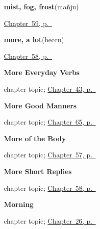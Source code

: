 \noindent\begin{minipage}[t]{\linewidth}
\raggedright
\textbf{mist, fog, frost}\enspace\emph{}\enspace(mañju)\par
\footnotesize \hyperref[ch:ka-weather-ground]{Chapter~59, p.~\pageref*{ch:ka-weather-ground}}
\end{minipage}\par\smallskip

\noindent\begin{minipage}[t]{\linewidth}
\raggedright
\textbf{more, a lot}\enspace\emph{}\enspace(heccu)\par
\footnotesize \hyperref[ch:ka-more-replies]{Chapter~58, p.~\pageref*{ch:ka-more-replies}}
\end{minipage}\par\smallskip

\noindent\begin{minipage}[t]{\linewidth}
\raggedright
\textbf{More Everyday Verbs}\par
\footnotesize chapter topic; \hyperref[ch:ka-more-verbs]{Chapter~43, p.~\pageref*{ch:ka-more-verbs}}
\end{minipage}\par\smallskip

\noindent\begin{minipage}[t]{\linewidth}
\raggedright
\textbf{More Good Manners}\par
\footnotesize chapter topic; \hyperref[ch:ka-manners]{Chapter~65, p.~\pageref*{ch:ka-manners}}
\end{minipage}\par\smallskip

\noindent\begin{minipage}[t]{\linewidth}
\raggedright
\textbf{More of the Body}\par
\footnotesize chapter topic; \hyperref[ch:ka-more-body]{Chapter~57, p.~\pageref*{ch:ka-more-body}}
\end{minipage}\par\smallskip

\noindent\begin{minipage}[t]{\linewidth}
\raggedright
\textbf{More Short Replies}\par
\footnotesize chapter topic; \hyperref[ch:ka-more-replies]{Chapter~58, p.~\pageref*{ch:ka-more-replies}}
\end{minipage}\par\smallskip

\noindent\begin{minipage}[t]{\linewidth}
\raggedright
\textbf{Morning}\par
\footnotesize chapter topic; \hyperref[ch:ka-morning]{Chapter~26, p.~\pageref*{ch:ka-morning}}
\end{minipage}\par\smallskip

